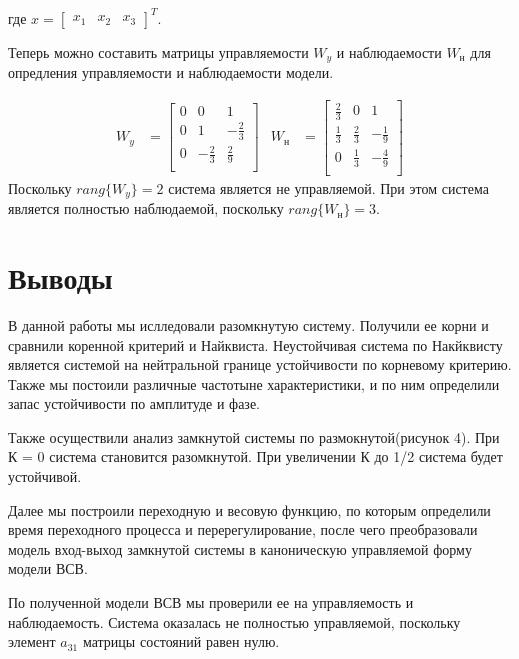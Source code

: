 \documentclass[a4paper, 12pt]{article}
\begin{document}
где $x = \begin{bmatrix} x_1 & x_2 & x_3 \end{bmatrix}^T$.
\newpage
\par
Теперь можно составить матрицы управляемости $W_y$ и наблюдаемости $W_\text{н}$ для опредления управляемости и наблюдаемости модели.

\begin{align*}
    W_y & = \begin{bmatrix}
        0 & 0 & 1 \\
        0 & 1 & -\frac{2}{3} \\
        0 & -\frac{2}{3} & \frac{2}{9} \\
    \end{bmatrix} & 
    W_\text{н} & = \begin{bmatrix}
        \frac{2}{3} & 0 & 1 \\
        \frac{1}{3} & \frac{2}{3} & -\frac{1}{9} \\
        0 & \frac{1}{3} & -\frac{4}{9} \\
    \end{bmatrix}
\end{align*}
Поскольку $rang\{W_y\} = 2$ система является не управляемой. При этом система является полностью наблюдаемой, поскольку $rang\{W_\text{н}\} = 3$.

\newpage
\section*{Выводы}
В данной работы мы ислледовали разомкнутую систему. Получили ее корни и сравнили коренной критерий и Найквиста. Неустойчивая система по Накйквисту является системой на нейтральной границе устойчивости по корневому критерию. Также мы постоили различные частотыне характеристики, и по ним определили запас устойчивости по амплитуде и фазе. \par
Также осуществили анализ замкнутой системы по размокнутой(рисунок 4). При К = 0 система становится разомкнутой. При увеличении К до 1/2 система будет устойчивой. \par
Далее мы построили переходную и весовую функцию, по которым определили время переходного процесса и перерегулирование, после чего преобразовали модель вход-выход замкнутой системы в каноническую управляемой форму модели ВСВ. \par
По полученной модели ВСВ мы проверили ее на управляемость и наблюдаемость. Система оказалась не полностью управляемой, поскольку элемент $a_{31}$ матрицы состояний равен нулю.
\end{document}
